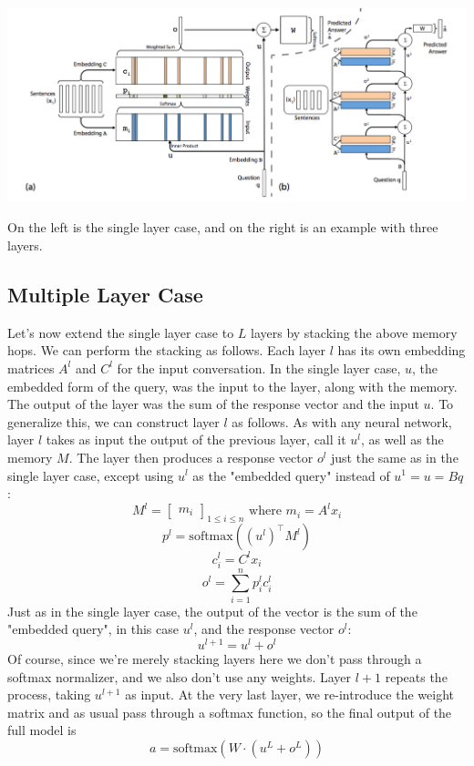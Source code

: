 \documentclass{article}
\begin{document}
\begin{center}
    \includegraphics[scale=0.5]{images/endtoendsinglelayer.png}
\end{center}

On the left is the single layer case, and on the right is an example with three layers.

\subsection{Multiple Layer Case}
Let's now extend the single layer case to $ L $ layers by stacking the above memory hops. We can perform the stacking as follows. Each layer $ l $ has its own embedding matrices $ A^l $ and $ C^l $ for the input conversation. 
\newline
In the single layer case, $ u $, the embedded form of the query, was the input to the layer, along with the memory. The output of the layer was the sum of the response vector and the input $ u $. To generalize this, we can construct layer $ l $ as follows. As with any neural network, layer $ l $ takes as input the output of the previous layer, call it $ u^l $, as well as the memory $ M $. The layer then produces a response vector $ o^l $ just the same as in the single layer case, except using $ u^l $ as the "embedded query" instead of $ u^1 = u = B q $:
$$ M^l = \begin{bmatrix} m_i \end{bmatrix}_{1 \leq i \leq n} \text{ where } m_i = A^l x_i $$
$$ p^l = \text{softmax} \left( (u^l)^\intercal M^l \right) $$
$$ c^l_i = C^l x_i $$
$$ o^l = \sum_{i = 1}^n p^l_i c^l_i $$
Just as in the single layer case, the output of the vector is the sum of the "embedded query", in this case $ u^l $, and the response vector $ o^l $:
$$ u^{l + 1} = u^l + o^l $$
Of course, since we're merely stacking layers here we don't pass through a softmax normalizer, and we also don't use any weights. Layer $ l + 1 $ repeats the process, taking $ u^{l + 1} $ as input. At the very last layer, we re-introduce the weight matrix and as usual pass through a softmax function, so the final output of the full model is
$$ a = \text{softmax}(W \cdot (u^L + o^L)) $$
\end{document}
